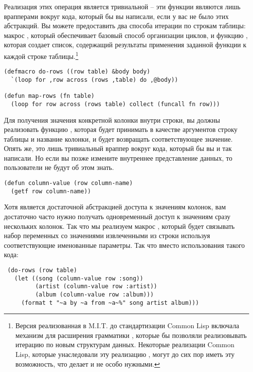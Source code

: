Реализация этих операция является тривиальной -- эти функции являются лишь врапперами
вокруг кода, который бы вы написали, если у вас не было этих абстракций.  Вы можете
предоставить два способа итерации по строкам таблицы: макрос , который
обеспечивает базовый способ организации циклов, и функцию , которая создает
список, содержащий результаты применения заданной функции к каждой строке
таблицы.\footnote{Версия  реализованная в M.I.T. до стандартизации Common Lisp
  включала механизм для расширения грамматики , которые бы позволяли
  реализовывать итерацию по новым структурам данных.  Некоторые реализации Common Lisp,
  которые унаследовали эту реализацию , могут до сих пор иметь эту возможность,
  что делает  и  не особо нужными.}

\begin{lstlisting}
(defmacro do-rows ((row table) &body body)
  `(loop for ,row across (rows ,table) do ,@body))

(defun map-rows (fn table)
  (loop for row across (rows table) collect (funcall fn row)))
\end{lstlisting}

Для получения значения конкретной колонки внутри строки, вы должны реализовать функцию
, которая будет принимать в качестве аргументов строку таблицы и
название колонки, и будет возвращать соответствующее значение.  Опять же, это лишь
тривиальный враппер вокруг кода, который бы вы и так написали.  Но если вы позже измените
внутреннее представление данных, то пользователи  не будут об этом
знать.

\begin{lstlisting}
(defun column-value (row column-name)
  (getf row column-name))
\end{lstlisting}

Хотя  является достаточной абстракцией доступа к значениям колонок, вам
достаточно часто нужно получать одновременный доступ к значениям сразу нескольких колонок.
Так что мы реализуем макрос , который будет связывать набор
переменных со значениями извлеченными из строки используя соответствующие именованные
параметры.  Так что вместо использования такого кода:

\begin{lstlisting}
 (do-rows (row table)
   (let ((song (column-value row :song))
         (artist (column-value row :artist))
         (album (column-value row :album)))
     (format t "~a by ~a from ~a~%" song artist album)))
\end{lstlisting}


